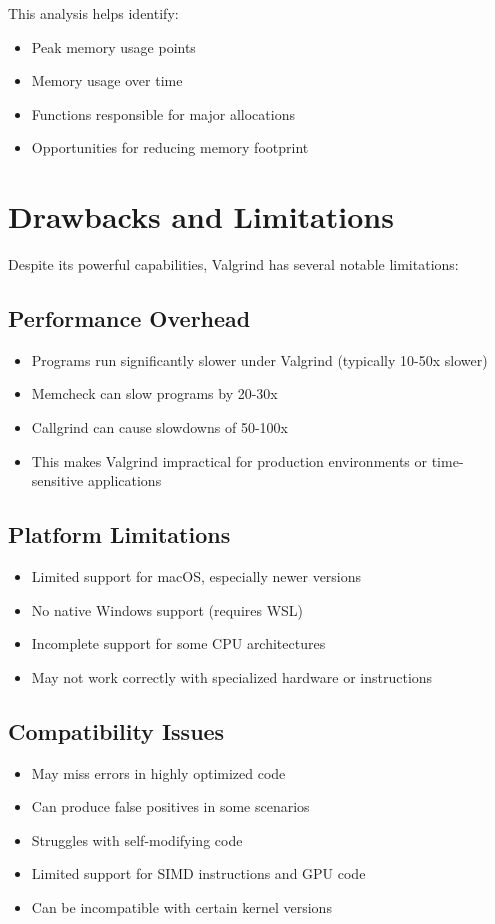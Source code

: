 \documentclass[11pt,a4paper]{article}
\begin{document}
This analysis helps identify:
\begin{itemize}
    \item Peak memory usage points
    \item Memory usage over time
    \item Functions responsible for major allocations
    \item Opportunities for reducing memory footprint
\end{itemize}

\section{Drawbacks and Limitations}

Despite its powerful capabilities, Valgrind has several notable limitations:

\subsection{Performance Overhead}
\begin{itemize}
    \item Programs run significantly slower under Valgrind (typically 10-50x slower)
    \item Memcheck can slow programs by 20-30x
    \item Callgrind can cause slowdowns of 50-100x
    \item This makes Valgrind impractical for production environments or time-sensitive applications
\end{itemize}

\subsection{Platform Limitations}
\begin{itemize}
    \item Limited support for macOS, especially newer versions
    \item No native Windows support (requires WSL)
    \item Incomplete support for some CPU architectures
    \item May not work correctly with specialized hardware or instructions
\end{itemize}

\subsection{Compatibility Issues}
\begin{itemize}
    \item May miss errors in highly optimized code
    \item Can produce false positives in some scenarios
    \item Struggles with self-modifying code
    \item Limited support for SIMD instructions and GPU code
    \item Can be incompatible with certain kernel versions
\end{itemize}
\end{document}

